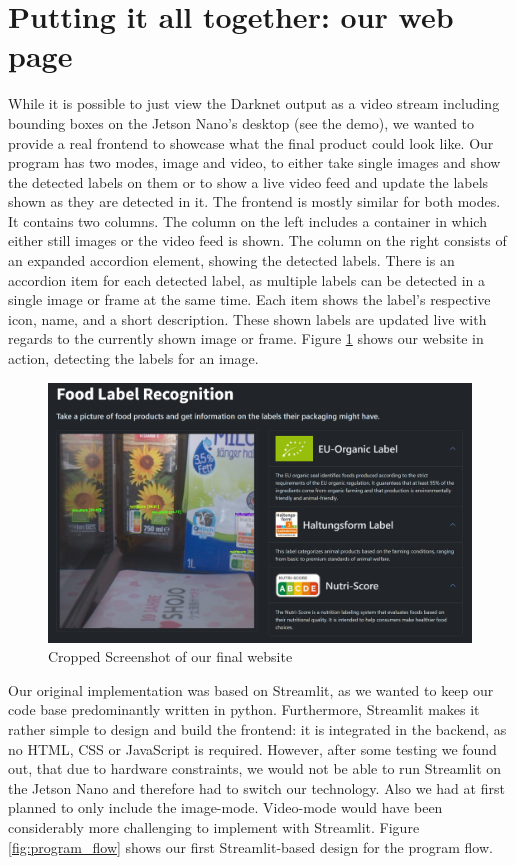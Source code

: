 \newpage
\section{Putting it all together: our web page}
\label{sec:deploy_frontend}

While it is possible to just view the Darknet output as a video stream including bounding boxes on the Jetson Nano's desktop (see the demo), we wanted to provide a real frontend to showcase what the final product could look like. 
Our program has two modes, image and video, to either take single images and show the detected labels on them or to show a live video feed and update the labels shown as they are detected in it. The frontend is mostly similar for both modes. It contains two columns. The column on the left includes a container in which either still images or the video feed is shown. The column on the right consists of an expanded accordion element, showing the detected labels. There is an accordion item for each detected label, as multiple labels can be detected in a single image or frame at the same time. Each item shows the label's respective icon, name, and a short description. These shown labels are updated live with regards to the currently shown image or frame. Figure \ref{fig:frontend} shows our website in action, detecting the labels for an image.

\begin{figure}[H]
    \includegraphics[width=\textwidth]{figures/web_sample_cropped.PNG}
    \caption{Cropped Screenshot of our final website}
    \label{fig:frontend}
\end{figure}

Our original implementation was based on Streamlit, as we wanted to keep our code base predominantly written in python. Furthermore, Streamlit makes it rather simple to design and build the frontend: it is integrated in the backend, as no HTML, CSS or JavaScript is required. However, after some testing we found out, that due to hardware constraints, we would not be able to run Streamlit on the Jetson Nano and therefore had to switch our technology. Also we had at first planned to only include the image-mode. Video-mode would have been considerably more challenging to implement with Streamlit. Figure \ref{fig:program_flow} shows our first Streamlit-based design for the program flow.

